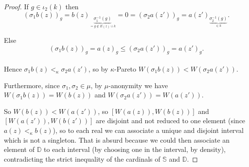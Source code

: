 \documentclass{article}
\begin{document}
\begin{proof}
  If $g\in \iota_2(k)$ then
  \[(\sigma_1 b(z))_g=b(z)_{\underset{=g \notin E(z)\cup k}
  {\underbrace{\sigma_1^{-1}(g)}}}=0=(\sigma_2 a(z'))_g=a(z')_{\underset{\in k}
  {\underbrace{\sigma_2^{-1}(g)}}}.\]

  Else
  \[(\sigma_1 b(z))_g=a(z)_g\leq (\sigma_2 a(z'))_g=a(z')_g.\] \\

  Hence $\sigma_1b(z)<_\kappa \sigma_2a(z')$, so by $\kappa$-Pareto
  $W(\sigma_1b(z))<W(\sigma_2a(z'))$.

  Furthermore, since $\sigma_1,\sigma_2\in\mu$, by $\mu$-anonymity we have
  $W(\sigma_1b(z))=W(b(z))$ and $W(\sigma_2a(z'))=W(a(z'))$.

  So $W(b(z))<W(a(z'))$, so $[W(a(z)),W(b(z))]$ and $[W(a(z')),W(b(z'))]$
  are disjoint and not reduced to one element (since $a(z)<_\kappa b(z)$), so to each real
  we can associate a unique and disjoint interval which is not a singleton. That is absurd because
  we could then associate an element of $\mathbb D$ to each interval (by choosing one in the interval, by density),
  contradicting the strict inequality of the cardinals of $\mathbb S$ and $\mathbb D$.
\end{proof}





\end{document}
